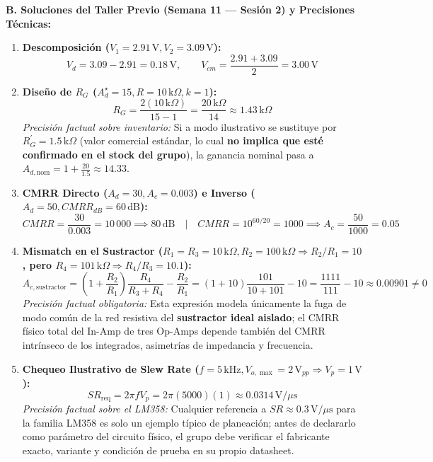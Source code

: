 \documentclass[10pt, a4paper]{article}
\begin{document}
\vspace{0.2cm}
\textbf{B. Soluciones del Taller Previo (Semana 11 — Sesión 2) y Precisiones Técnicas:}
\begin{enumerate}
    \setlength{\itemsep}{2pt}
    \item \textbf{Descomposición ($V_1=2.91\,\text{V}, V_2=3.09\,\text{V}$):}
    \begin{equation*}
        V_d = 3.09 - 2.91 = \boxed{0.18\,\text{V}}, \qquad V_{cm} = \frac{2.91 + 3.09}{2} = \boxed{3.00\,\text{V}}
    \end{equation*}
    \item \textbf{Diseño de $R_G$ ($A_d^\star=15, R=10\,\text{k}\Omega, k=1$):}
    \begin{equation*}
        R_G = \frac{2(10\,\text{k}\Omega)}{15 - 1} = \frac{20\,\text{k}\Omega}{14} \approx \boxed{1.43\,\text{k}\Omega}
    \end{equation*}
    \textit{Precisión factual sobre inventario:} Si a modo ilustrativo se sustituye por $R_G^\prime = 1.5\,\text{k}\Omega$ (valor comercial estándar, lo cual \textbf{no implica que esté confirmado en el stock del grupo}), la ganancia nominal pasa a $A_{d,\mathrm{nom}} = 1 + \frac{20}{1.5} \approx \boxed{14.33}$.
    \item \textbf{CMRR Directo ($A_d=30, A_c=0.003$) e Inverso ($A_d=50, CMRR_{dB}=60\,\text{dB}$):}
    \begin{equation*}
        CMRR = \frac{30}{0.003} = 10\,000 \implies \boxed{80\,\text{dB}} \quad \Big| \quad CMRR = 10^{60/20} = 1000 \implies A_c = \frac{50}{1000} = \boxed{0.05}
    \end{equation*}
    \item \textbf{Mismatch en el Sustractor ($R_1=R_3=10\,\text{k}\Omega, R_2=100\,\text{k}\Omega \Rightarrow R_2/R_1=10$, pero $R_4=101\,\text{k}\Omega \Rightarrow R_4/R_3=10.1$):}
    \begin{equation*}
        A_{c,\mathrm{sustractor}} = \left(1 + \frac{R_2}{R_1}\right)\frac{R_4}{R_3 + R_4} - \frac{R_2}{R_1} = (1 + 10)\frac{101}{10 + 101} - 10 = \frac{1111}{111} - 10 \approx \boxed{0.00901 \neq 0}
    \end{equation*}
    \textit{Precisión factual obligatoria:} Esta expresión modela únicamente la fuga de modo común de la red resistiva del \textbf{sustractor ideal aislado}; el CMRR físico total del In-Amp de tres Op-Amps depende también del CMRR intrínseco de los integrados, asimetrías de impedancia y frecuencia.
    \item \textbf{Chequeo Ilustrativo de Slew Rate ($f=5\,\text{kHz}, V_{o,\max}=2\,\text{V}_{pp} \Rightarrow V_p=1\,\text{V}$):}
    \begin{equation*}
        SR_{\mathrm{req}} = 2\pi f V_p = 2\pi(5000)(1) \approx \boxed{0.0314\,\text{V}/\mu\text{s}}
    \end{equation*}
    \textit{Precisión factual sobre el LM358:} Cualquier referencia a $SR \approx 0.3\,\text{V}/\mu\text{s}$ para la familia LM358 es solo un ejemplo típico de planeación; antes de declararlo como parámetro del circuito físico, el grupo debe verificar el fabricante exacto, variante y condición de prueba en su propio datasheet.
\end{enumerate}
\end{document}
